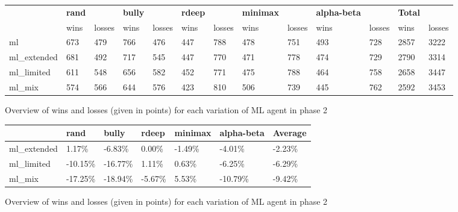 \documentclass[master]{subfiles}
\begin{document}
\begin{figure}
\centering
\begin{adjustwidth}{-30pt}{}

\begin{tabular}{ | l | l l | l l | l l | l l | l l || l l | }
\hline
& \textbf{rand} & & \textbf{bully} & & \textbf{rdeep} & & \textbf{minimax} & & \textbf{alpha-beta} & & \textbf{Total} & \\
& wins & losses  & wins & losses  & wins & losses  & wins & losses  & wins & losses  & wins & losses \\ \hline
ml &  673 & 479 & 766 & 476 & 447 & 788 & 478 & 751 & 493 & 728 & 2857 & 3222\\ \hline
ml\_extended & 681 & 492 & 717 & 545 & 447 & 770 & 471 & 778 & 474 & 729 & 2790 & 3314 \\ \hline
ml\_limited & 611 & 548 & 656 & 582 & 452 & 771 & 475 & 788 & 464 & 758 & 2658 & 3447 \\ \hline
ml\_mix & 574 & 566 & 644 & 576 & 423 & 810 & 506 & 739 & 445 & 762 & 2592 & 3453 \\ \hline
\end{tabular}

\end{adjustwidth}
\caption{Overview of wins and losses (given in points) for each variation of ML agent in phase  2}
\label{fig:overviewp2}
\end{figure}

\begin{figure}
\centering
\begin{adjustwidth}{-0pt}{}

\begin{tabular}{ | l | l | l | l | l | l || l | }
\hline
& \textbf{rand} & \textbf{bully} & \textbf{rdeep} & \textbf{minimax} & \textbf{alpha-beta} & \textbf{Average} \\ \hline
ml\_extended & 1.17\% & -6.83\% & 0.00\% & -1.49\% & -4.01\% & -2.23\% \\ \hline
ml\_limited & -10.15\% & -16.77\% & 1.11\% & 0.63\% & -6.25\% & -6.29\% \\ \hline
ml\_mix & -17.25\% & -18.94\% & -5.67\% & 5.53\% & -10.79\% & -9.42\% \\ \hline
\end{tabular}

\end{adjustwidth}
\caption{Overview of wins and losses (given in points) for each variation of ML agent in phase  2}
\label{fig:overviewp2percent}
\end{figure}
\clearpage
\end{document}
